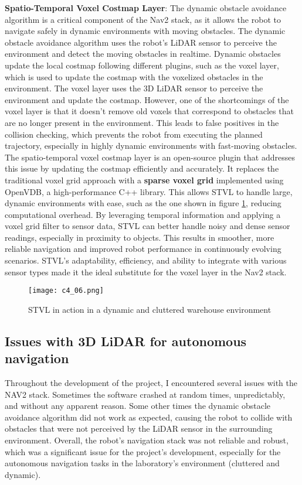 \textbf{Spatio-Temporal Voxel Costmap Layer}:
The dynamic obstacle avoidance algorithm is a critical component of the Nav2 stack, as it allows the robot to navigate
safely in dynamic environments with moving obstacles. The dynamic obstacle avoidance algorithm uses the robot's LiDAR sensor
to perceive the environment and detect the moving obstacles in realtime. Dynamic obstacles update the local costmap
following different plugins, such as the voxel layer, which is used to update the costmap with the voxelized obstacles
in the environment. The voxel layer uses the 3D LiDAR sensor to perceive the environment and update the costmap.
However, one of the shortcomings of the voxel layer is that it doesn't remove old voxels that correspond to obstacles
that are no longer present in the environment. This leads to false positives in the collision checking, which prevents
the robot from executing the planned trajectory, especially in highly dynamic environments with fast-moving obstacles.
The spatio-temporal voxel costmap layer is an open-source plugin that addresses this issue by updating the costmap
efficiently and accurately. It replaces the traditional voxel grid approach with a \textbf{sparse voxel grid} implemented
using OpenVDB, a high-performance C++ library. This allows STVL to handle large, dynamic environments with ease,
such as the one shown in figure \ref{fig:stvl}, 
reducing computational overhead. By leveraging temporal information and applying a voxel grid filter to sensor data,
STVL can better handle noisy and dense sensor readings, especially in proximity to objects. 
This results in smoother, more reliable navigation and improved robot performance in continuously evolving scenarios.
STVL's adaptability, efficiency, and ability to integrate with various sensor types made it the ideal substitute
for the voxel layer in the Nav2 stack.

\begin{figure}[t]
    \centering
    \texttt{[image: c4\_06.png]}
    \caption{STVL in action in a dynamic and cluttered warehouse environment}
    \label{fig:stvl}
\end{figure}


\subsection{Issues with 3D LiDAR for autonomous navigation}

Throughout the development of the project, I encountered several issues with the NAV2 stack.
Sometimes the software crashed at random times, unpredictably, and without any apparent reason.
Some other times the dynamic obstacle avoidance algorithm did not work as expected, causing the robot to collide
with obstacles that were not perceived by the LiDAR sensor in the surrounding environment.
Overall, the robot's navigation stack was not reliable and robust, which was a significant issue for the project's development,
especially for the autonomous navigation tasks in the laboratory's environment (cluttered and dynamic).

